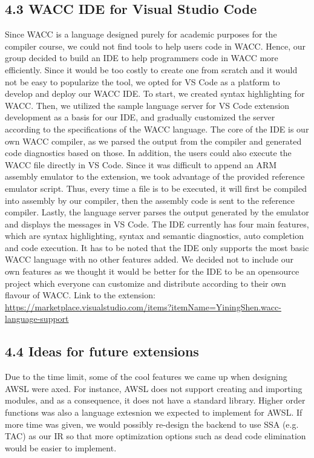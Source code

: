 \documentclass[10pt,a4paper]{report}
\begin{document}
  \subsection*{4.3 WACC IDE for Visual Studio Code}
  Since WACC is a language designed purely for academic purposes for the compiler course, we could not find tools to help users code in WACC. Hence, 
  our group decided to build an IDE to help programmers code in WACC more efficiently. Since it would be too costly to create one from scratch and 
  it would not be easy to popularize the tool, we opted for VS Code as a platform to develop and deploy our WACC IDE. To start, we created syntax 
  highlighting for WACC. Then, we utilized the sample language server for VS Code extension development as a basis for our IDE, and gradually customized 
  the server according to the specifications of the WACC language. The core of the IDE is our own WACC compiler, as we parsed the output from the compiler 
  and generated code diagnostics based on those. In addition, the users could also execute the WACC file directly in VS Code. Since it was difficult to 
  append an ARM assembly emulator to the extension, we took advantage of the provided reference emulator script. Thus, every time a file is to be executed, 
  it will first be compiled into assembly by our compiler, then the assembly code is sent to the reference compiler. Lastly, the language server parses the 
  output generated by the emulator and displays the messages in VS Code. The IDE currently has four main features, which are syntax highlighting, syntax 
  and semantic diagnostics, auto completion and code execution. It has to be noted that the IDE only supports the most basic WACC language with no other 
  features added. We decided not to include our own features as we thought it would be better for the IDE to be an opensource project which everyone can 
  customize and distribute according to their own flavour of WACC. Link to the extension: 
  \url{https://marketplace.visualstudio.com/items?itemName=YiningShen.wacc-language-support}

  \subsection*{4.4 Ideas for future extensions}
  Due to the time limit, some of the cool features we came up when designing AWSL were axed. For instance, AWSL does not support creating and importing modules,
  and as a consequence, it does not have a standard library. Higher order functions was also a language extesnion we expected to implement for AWSL.
  If more time was given, we would possibly re-design the backend to use SSA (e.g. TAC) as our IR so that more optimization options such as dead code elimination 
  would be easier to implement.
\end{document}
